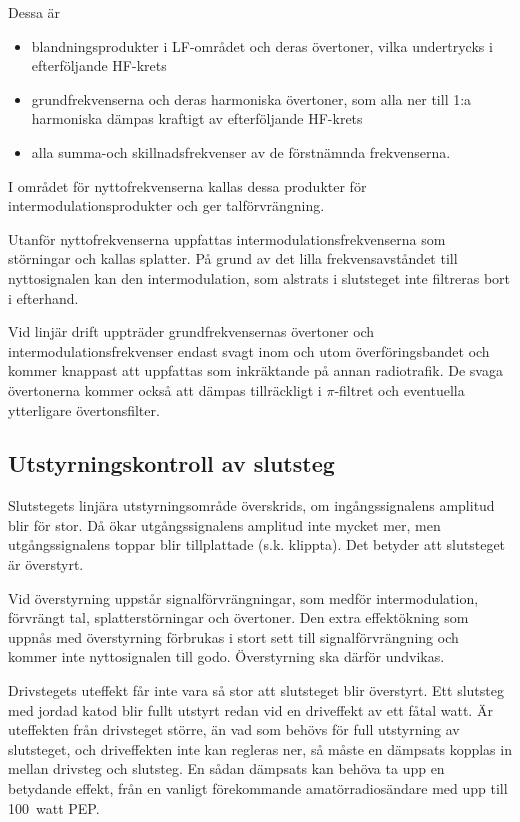 Dessa är
\begin{itemize}
\item blandningsprodukter i LF-området och deras övertoner, vilka
  undertrycks i efterföljande HF-krets

\item grundfrekvenserna och deras harmoniska övertoner, som alla ner
  till 1:a harmoniska dämpas kraftigt av efterföljande HF-krets

\item alla summa-och skillnadsfrekvenser av de förstnämnda frekvenserna.
\end{itemize}

I området för nyttofrekvenserna kallas dessa produkter för
intermodulationsprodukter och ger talförvrängning.

Utanför nyttofrekvenserna uppfattas intermodulationsfrekvenserna som
störningar och kallas splatter.
På grund av det lilla frekvensavståndet till nyttosignalen kan den
intermodulation, som alstrats i slutsteget inte filtreras bort i efterhand.

Vid linjär drift uppträder grundfrekvensernas övertoner och
intermodulationsfrekvenser endast svagt inom och utom
överföringsbandet och kommer knappast att uppfattas som inkräktande på
annan radiotrafik.
De svaga övertonerna kommer också att dämpas tillräckligt i \(\pi \)-filtret
och eventuella ytterligare övertonsfilter.


\subsection{Utstyrningskontroll av slutsteg}

Slutstegets linjära utstyrningsområde överskrids, om ingångssignalens
amplitud blir för stor.
Då ökar utgångssignalens amplitud inte mycket mer, men utgångssignalens toppar
blir tillplattade (s.k. klippta).
Det betyder att slutsteget är överstyrt.

Vid överstyrning uppstår signalförvrängningar, som medför intermodulation,
förvrängt tal, splatterstörningar och övertoner.
Den extra effektökning som uppnås med överstyrning förbrukas i stort sett
till signalförvrängning och kommer inte nyttosignalen till godo.
Överstyrning ska därför undvikas.

Drivstegets uteffekt får inte vara så stor att slutsteget blir överstyrt.
Ett slutsteg med jordad katod blir fullt utstyrt redan vid en driveffekt av ett
fåtal watt.
Är uteffekten från drivsteget större, än vad som behövs för full utstyrning av
slutsteget, och driveffekten inte kan regleras ner, så måste en dämpsats
kopplas in mellan drivsteg och slutsteg.
En sådan dämpsats kan behöva ta upp en betydande effekt, från en vanligt
förekommande amatörradiosändare med upp till 100~watt PEP.

